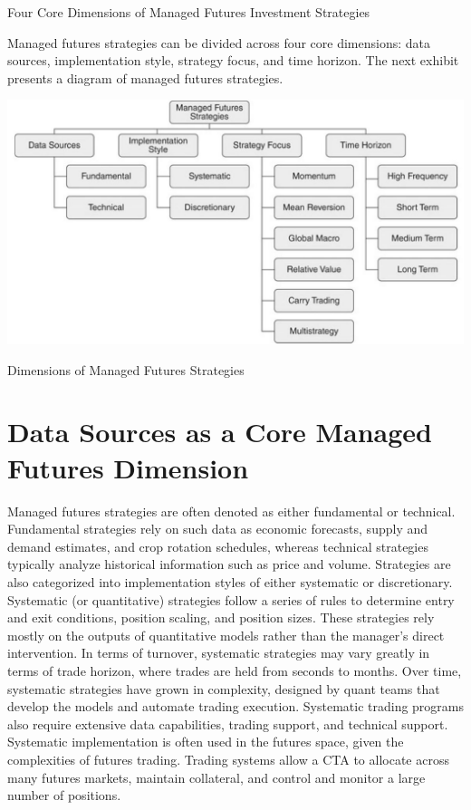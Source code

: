 \documentclass[11pt]{article}
\begin{document}
Four Core Dimensions of Managed Futures Investment Strategies

Managed futures strategies can be divided across four core dimensions: data sources, implementation style, strategy focus, and time horizon. The next exhibit presents a diagram of managed futures strategies.

\begin{center}
\includegraphics[max width=\textwidth]{2024_04_09_bb15184d6b10431fa36bg-2}
\end{center}

Dimensions of Managed Futures Strategies

\section*{Data Sources as a Core Managed Futures Dimension}
Managed futures strategies are often denoted as either fundamental or technical. Fundamental strategies rely on such data as economic forecasts, supply and demand estimates, and crop rotation schedules, whereas technical strategies typically analyze historical information such as price and volume. Strategies are also categorized into implementation styles of either systematic or discretionary. Systematic (or quantitative) strategies follow a series of rules to determine entry and exit conditions, position scaling, and position sizes. These strategies rely mostly on the outputs of quantitative models rather than the manager's direct intervention. In terms of turnover, systematic strategies may vary greatly in terms of trade horizon, where trades are held from seconds to months. Over time, systematic strategies have grown in complexity, designed by quant teams that develop the models and automate trading execution. Systematic trading programs also require extensive data capabilities, trading support, and technical support. Systematic implementation is often used in the futures space, given the complexities of futures trading. Trading systems allow a CTA to allocate across many futures markets, maintain collateral, and control and monitor a large number of positions.
\end{document}
